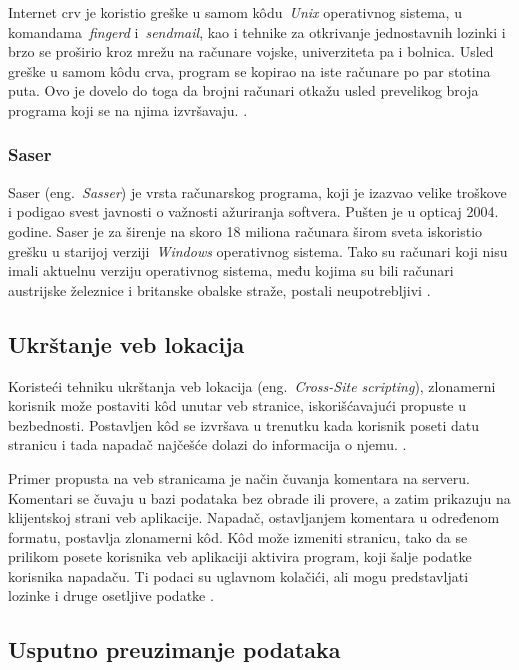 \documentclass[a4paper]{article}
\begin{document}
Internet crv je koristio greške u samom kôdu~{\em Unix} operativnog sistema, u komandama~{\em fingerd} i~{\em sendmail}, kao i tehnike za otkrivanje jednostavnih lozinki i brzo se proširio kroz mrežu na računare vojske, univerziteta pa i bolnica. Usled greške u samom kôdu crva, program se kopirao na iste računare po par stotina puta. Ovo je dovelo do toga da brojni računari otkažu usled prevelikog broja programa koji se na njima izvršavaju. \cite{internet_worm}.


\subsubsection{Saser}
Saser (eng.~{\em Sasser}) je vrsta računarskog programa, koji je izazvao velike troškove i podigao svest javnosti o važnosti ažuriranja softvera. Pušten je u opticaj 2004. godine. Saser je za širenje na skoro 18 miliona računara širom sveta iskoristio grešku u starijoj verziji~{\em Windows} operativnog sistema. Tako su računari koji nisu imali aktuelnu verziju operativnog sistema, među kojima su bili računari austrijske železnice i britanske obalske straže, postali neupotrebljivi \cite{ethics}.

\subsection{Ukrštanje veb lokacija}

Koristeći tehniku ukrštanja veb lokacija (eng.~{\em Cross-Site scripting}), zlonamerni korisnik može 
postaviti kôd unutar veb stranice, iskorišćavajući 
propuste u bezbednosti. Postavljen kôd se izvršava u 
trenutku kada korisnik poseti datu stranicu i tada 
napadač najčešće dolazi do informacija o njemu. \cite{ethics,xss}.

Primer propusta na veb stranicama je način čuvanja komentara na serveru. Komentari se čuvaju u bazi podataka bez obrade ili provere, a zatim prikazuju na klijentskoj strani veb aplikacije. Napadač, ostavljanjem komentara u određenom formatu, postavlja zlonamerni kôd. Kôd može izmeniti stranicu, tako da se prilikom posete korisnika veb aplikaciji aktivira program, koji šalje podatke korisnika napadaču. Ti podaci su uglavnom kolačići, ali mogu predstavljati lozinke i druge osetljive podatke \cite{xss}.

\subsection{Usputno preuzimanje podataka }
\end{document}
